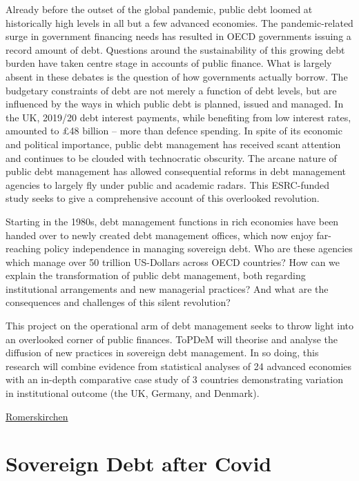 \documentclass[
]{book}
\begin{document}
Already before the outset of the global pandemic, public debt loomed at historically high levels in all but a few advanced economies. The pandemic-related surge in government financing needs has resulted in OECD governments issuing a record amount of debt. Questions around the sustainability of this growing debt burden have taken centre stage in accounts of public finance. What is largely absent in these debates is the question of how governments actually borrow. The budgetary constraints of debt are not merely a function of debt levels, but are influenced by the ways in which public debt is planned, issued and managed. In the UK, 2019/20 debt interest payments, while benefiting from low interest rates, amounted to £48 billion -- more than defence spending. In spite of its economic and political importance, public debt management has received scant attention and continues to be clouded with technocratic obscurity. The arcane nature of public debt management has allowed consequential reforms in debt management agencies to largely fly under public and academic radars. This ESRC-funded study seeks to give a comprehensive account of this overlooked revolution.

Starting in the 1980s, debt management functions in rich economies have been handed over to newly created debt management offices, which now enjoy far-reaching policy independence in managing sovereign debt. Who are these agencies which manage over 50 trillion US-Dollars across OECD countries? How can we explain the transformation of public debt management, both regarding institutional arrangements and new managerial practices? And what are the consequences and challenges of this silent revolution?

This project on the operational arm of debt management seeks to throw light into an overlooked corner of public finances. ToPDeM will theorise and analyse the diffusion of new practices in sovereign debt management. In so doing, this research will combine evidence from statistical analyses of 24 advanced economies with an in-depth comparative case study of 3 countries demonstrating variation in institutional outcome (the UK, Germany, and Denmark).

\href{https://www.public-debt.sps.ed.ac.uk/}{Romerskirchen}

\hypertarget{sovereign-debt-after-covid}{%
\section{Sovereign Debt after Covid}\label{sovereign-debt-after-covid}}
\end{document}
